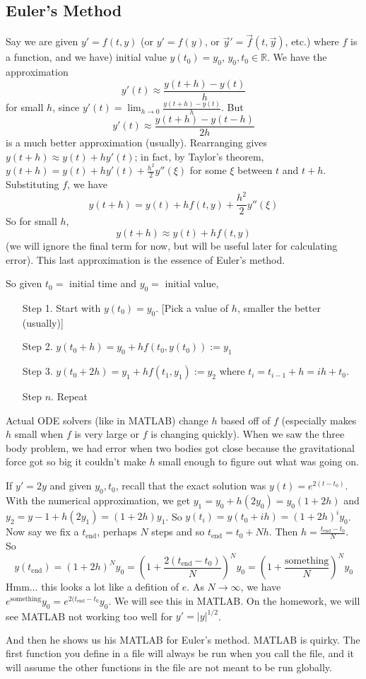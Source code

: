 \documentclass{article}
\theoremstyle{plain}
\theoremstyle{remark}
\newcommand{\R}{{\mathbb R}}
\begin{document}
\subsection{Euler's Method}
Say we are given $y' = f(t,y)$
(or $y' = f(y)$, or $\vec{y}' = \vec{f}(t,\vec{y})$, etc.)
where $f$ is a function,
and we have) initial value $y(t_0) = y_0$, $y_0,t_0 \in \R$.
We have the approximation
\[
	y'(t) \approx \frac{y(t+h) - y(t)}{h}
\]
for small $h$, since $y'(t) = \lim_{h\to0}\frac{y(t+h) - y(t)}{h}$.
But
\[
	y'(t) \approx \frac{y(t+h) - y(t-h)}{2h}
\]
is a much better approximation (usually).
Rearranging gives $y(t+h) \approx y(t) + hy'(t)$;
in fact, by Taylor's theorem, $y(t+h) = y(t) + hy'(t) + \frac{h^2}{2}y''(\xi)$
for some $\xi$ between $t$ and $t+h$.
Substituting $f$, we have
\[
	y(t+h) = y(t) + hf(t,y) + \frac{h^2}{2}y''(\xi)
\]
So for small $h$,
\[
	y(t+h) \approx y(t) + hf(t,y)
\]
(we will ignore the final term for now, but will be useful later for calculating error).
This last approximation is the essence of Euler's method.

So given $t_0 = $ initial time and $y_0 = $ initial value,
\begin{enumerate}
	\item[Step 1.] Start with $y(t_0) = y_0$.
		[Pick a value of $h$, smaller the better (usually)]
	\item[Step 2.] $y(t_0 + h) = y_0 + hf(t_0,y(t_0)) := y_1$
	\item[Step 3.] $y(t_0+2h) = y_1 + hf(t_1,y_1) := y_2$
		where $t_i = t_{i-1} + h = ih+t_0$.
	\item[Step $n$.] Repeat
\end{enumerate}

Actual ODE solvers (like in MATLAB) change $h$ based off of $f$
(especially makes $h$ small when $f$ is very large or $f$ is changing quickly).
When we saw the three body problem, we had error when two bodies got close
because the gravitational force got so big it couldn't make $h$ small enough
to figure out what was going on.

If $y' = 2y$ and given $y_0,t_0$,
recall that the exact solution was $y(t) = e^{2(t-t_0)}$.
With the numerical approximation, we get
$y_1 = y_0 + h(2y_0) = y_0(1+2h)$
and $y_2 = y-1 + h(2y_1) = (1+2h)y_1$.
So $y(t_i) = y(t_0 + ih) = (1+2h)^iy_0$.
Now say we fix a $t_{\text{end}}$, perhaps $N$ steps
and so $t_{\text{end}} = t_0 + Nh$.
Then $h = \frac{t_{\text{end}} - t_0}{N}$.
So
\[
	y(t_{\text{end}}) = (1+2h)^Ny_0
	= \left(1+\frac{2(t_{\text{end}} - t_0)}{N}\right)^Ny_0
	= \left(1+\frac{\text{something}}{N}\right)^Ny_0
\]
Hmm... this looks a lot like a defition of $e$.
As $N \to \infty$, we have $e^{\text{something}}y_0 = e^{2(t_{\text{end}}-t_0}y_0$.
We will see this in MATLAB.
On the homework, we will see MATLAB not working too well for $y' = \lvert y \rvert^{1/2}$.

And then he shows us his MATLAB for Euler's method.
MATLAB is quirky.
The first function you define in a file will always be run
when you call the file,
and it will assume the other functions in the file are not meant to be run globally.
\end{document}
